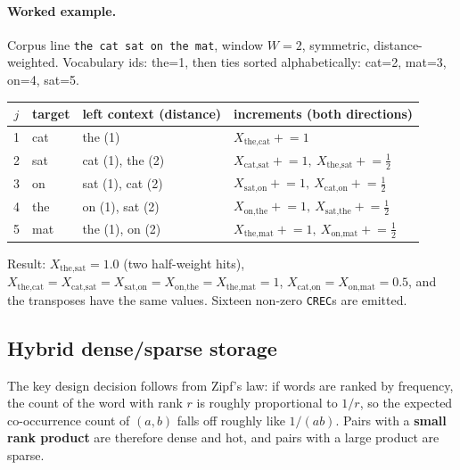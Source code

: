 \documentclass[11pt,a4paper]{article}
\begin{document}
\paragraph{Worked example.} Corpus line \texttt{the cat sat on the mat}, window $W=2$,
symmetric, distance-weighted. Vocabulary ids: the=1, then ties sorted alphabetically:
cat=2, mat=3, on=4, sat=5.

\begin{center}
\begin{tabular}{clll}
\toprule
$j$ & target & left context (distance) & increments (both directions)\\
\midrule
1 & cat & the (1) & $X_{\text{the,cat}}\mathrel{+}=1$ \\
2 & sat & cat (1), the (2) & $X_{\text{cat,sat}}\mathrel{+}=1,\ X_{\text{the,sat}}\mathrel{+}=\tfrac12$ \\
3 & on  & sat (1), cat (2) & $X_{\text{sat,on}}\mathrel{+}=1,\ X_{\text{cat,on}}\mathrel{+}=\tfrac12$ \\
4 & the & on (1), sat (2)  & $X_{\text{on,the}}\mathrel{+}=1,\ X_{\text{sat,the}}\mathrel{+}=\tfrac12$ \\
5 & mat & the (1), on (2)  & $X_{\text{the,mat}}\mathrel{+}=1,\ X_{\text{on,mat}}\mathrel{+}=\tfrac12$ \\
\bottomrule
\end{tabular}
\end{center}
Result: $X_{\text{the,sat}}=1.0$ (two half-weight hits), $X_{\text{the,cat}}=X_{\text{cat,sat}}
=X_{\text{sat,on}}=X_{\text{on,the}}=X_{\text{the,mat}}=1$, $X_{\text{cat,on}}=X_{\text{on,mat}}=0.5$,
and the transposes have the same values. Sixteen non-zero \texttt{CREC}s are emitted.

\subsection{Hybrid dense/sparse storage}

The key design decision follows from Zipf's law: if words are ranked by frequency, the
count of the word with rank $r$ is roughly proportional to $1/r$, so the expected
co-occurrence count of $(a,b)$ falls off roughly like $1/(ab)$. Pairs with a
\textbf{small rank product} are therefore dense and hot, and pairs with a large product are
sparse.
\end{document}
